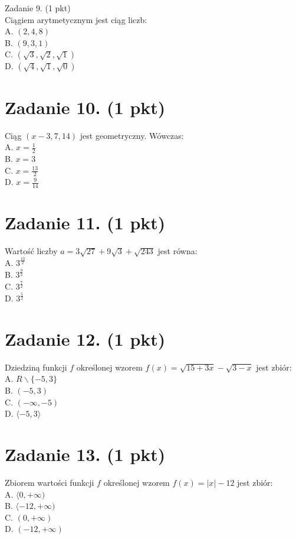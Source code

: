 \documentclass[10pt]{article}
\begin{document}
Zadanie 9. (1 pkt)\\
Ciągiem arytmetycznym jest ciąg liczb:\\
A. \((2,4,8)\)\\
B. \((9,3,1)\)\\
C. \((\sqrt{3}, \sqrt{2}, \sqrt{1})\)\\
D. \((\sqrt{4}, \sqrt{1}, \sqrt{0})\)

\section*{Zadanie 10. (1 pkt)}
Ciąg \((x-3,7,14)\) jest geometryczny. Wówczas:\\
A. \(x=\frac{1}{2}\)\\
B. \(x=3\)\\
C. \(x=\frac{13}{2}\)\\
D. \(x=\frac{9}{14}\)

\section*{Zadanie 11. (1 pkt)}
Wartość liczby \(a=3 \sqrt{27}+9 \sqrt{3}+\sqrt{243}\) jest równa:\\
A. \(3^{\frac{10}{2}}\)\\
B. \(3^{\frac{9}{2}}\)\\
C. \(3^{\frac{7}{2}}\)\\
D. \(3^{\frac{5}{2}}\)

\section*{Zadanie 12. (1 pkt)}
Dziedziną funkcji \(f\) określonej wzorem \(f(x)=\sqrt{15+3 x}-\sqrt{3-x}\) jest zbiór:\\
A. \(R \backslash\{-5,3\}\)\\
B. \((-5,3)\)\\
C. \((-\infty,-5)\)\\
D. \(\langle-5,3\rangle\)

\section*{Zadanie 13. (1 pkt)}
Zbiorem wartości funkcji \(f\) określonej wzorem \(f(x)=|x|-12\) jest zbiór:\\
A. \(\langle 0,+\infty)\)\\
B. \(\langle-12,+\infty)\)\\
C. \((0,+\infty)\)\\
D. \((-12,+\infty)\)
\end{document}
